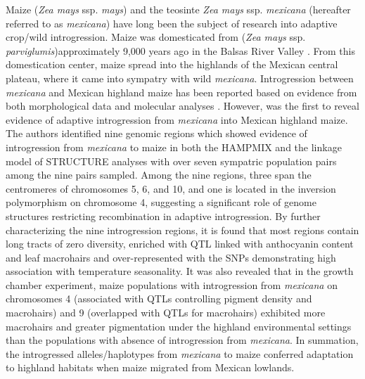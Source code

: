 \documentclass[11pt]{article}
\begin{document}
\begin{enumerate}
\begin{enumerate}
Maize (\emph{Zea mays} ssp. \emph{mays}) and the teosinte \emph{Zea mays} ssp. \emph{mexicana} (hereafter referred to as \emph{mexicana}) have long been the subject of research into adaptive crop/wild introgression.
Maize was domesticated from (\emph{Zea mays} ssp. \emph{parviglumis})approximately 9,000 years ago in the Balsas River Valley \cite{matsuoka2002single}.
From this domestication center, maize spread into the highlands of the Mexican central plateau, where it came into sympatry with wild \emph{mexicana}.
Introgression between \emph{mexicana} and Mexican highland maize has been reported based on evidence from both morphological data \cite {wilkes1977, lauter2004, doebley1984} and molecular analyses \cite{matsuoka2002, vanHeerwaarden2011, doebley1987, warburton2011, fukunaga2005}.
However, \citep{hufford2013} was the first to reveal evidence of adaptive introgression from \emph{mexicana} into Mexican highland maize.
The authors identified nine genomic regions which showed evidence of introgression from \emph{mexicana} to maize in both the HAMPMIX and the linkage model of STRUCTURE analyses with over seven sympatric population pairs among the nine pairs sampled.
Among the nine regions, three span the centromeres of chromosomes 5, 6, and 10, and one is located in the inversion polymorphism on chromosome 4, suggesting a significant role of genome structures restricting recombination in adaptive introgression.
By further characterizing the nine introgression regions, it is found that most regions contain long tracts of zero diversity, enriched with QTL linked with anthocyanin content and leaf macrohairs \cite{lauter2004} and over-represented with the SNPs demonstrating high association with temperature seasonality.
It was also revealed that in the growth chamber experiment, maize populations with introgression from \emph{mexicana} on chromosomes 4 (associated with QTLs controlling pigment density and macrohairs) and 9 (overlapped with QTLs for macrohairs) exhibited more macrohairs and greater pigmentation under the highland environmental settings than the populations with absence of introgression from \emph{mexicana}.
In summation, the introgressed alleles/haplotypes from \emph{mexicana} to maize conferred adaptation to highland habitats when maize migrated from Mexican lowlands.



\end{enumerate}
\end{enumerate}
\end{document}
